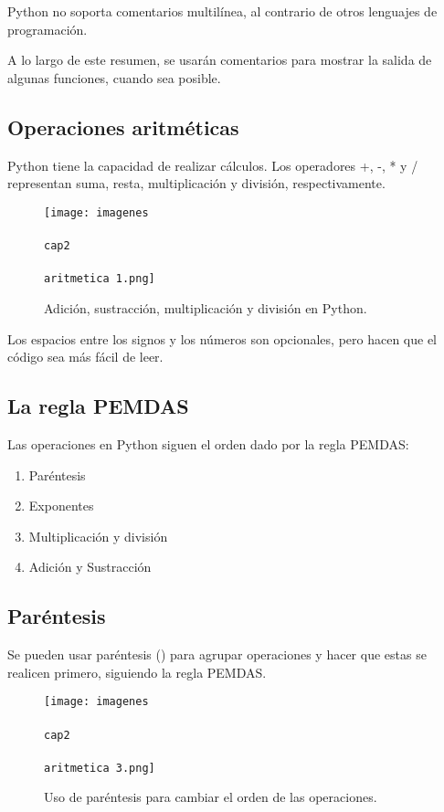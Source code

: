 \documentclass{article}
\begin{document}
      Python no soporta comentarios multilínea, al contrario de otros lenguajes de programación.

      A lo largo de este resumen, se usarán comentarios para mostrar la salida de algunas funciones, cuando sea posible.

    \subsection{Operaciones aritméticas}
      Python tiene la capacidad de realizar cálculos. Los operadores +, -, * y / representan suma, resta, multiplicación y división, respectivamente.

      \begin{figure}[ht!]
        \texttt{[image: imagenes\\\\cap2\\\\aritmetica 1.png]}
        \caption{Adición, sustracción, multiplicación y división en Python.}
      \end{figure}

      Los espacios entre los signos y los números son opcionales, pero hacen que el código sea más fácil de leer.

    \subsection{La regla PEMDAS}
      Las operaciones en Python siguen el orden dado por la regla PEMDAS:

      \begin{enumerate}
        \item Paréntesis
        \item Exponentes
        \item Multiplicación y división
        \item Adición y Sustracción
      \end{enumerate}


    \subsection{Paréntesis}
      Se pueden usar paréntesis () para agrupar operaciones y hacer que estas se realicen primero, siguiendo la regla PEMDAS.

      \begin{figure}[ht!]
        \texttt{[image: imagenes\\\\cap2\\\\aritmetica 3.png]}
        \caption{Uso de paréntesis para cambiar el orden de las operaciones.}
      \end{figure}
\end{document}
